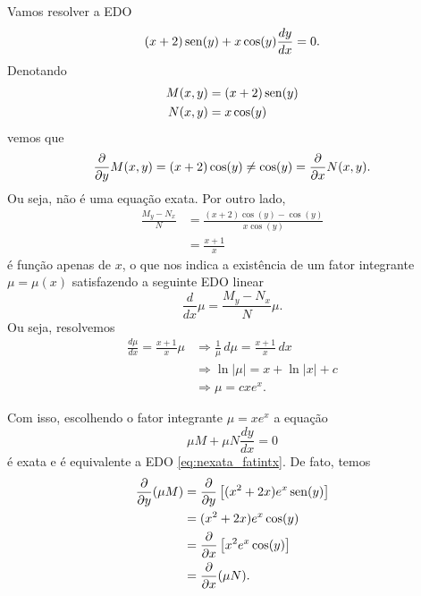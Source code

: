 \begin{ex}
  Vamos resolver a EDO
  \begin{equation}\label{eq:nexata_fatintx}
    (x+2)\operatorname{sen}(y) + x\cos(y)\frac{dy}{dx} = 0.
  \end{equation}
  Denotando
  \begin{align}
    M(x,y) &= (x+2)\operatorname{sen}(y) \\
    N(x,y) &= x\cos(y)
  \end{align}
  vemos que
  \begin{equation}
    \frac{\partial}{\partial y}M(x,y) = (x+2)\cos(y) \neq \cos(y) = \frac{\partial}{\partial x}N(x,y).
  \end{equation}
  Ou seja, não é uma equação exata. Por outro lado,
  \begin{align}
    \frac{M_y-N_x}{N} &= \frac{(x+2)\cos(y) - \cos(y)}{x\cos(y)} \\
                      &= \frac{x+1}{x}
  \end{align}
  é função apenas de $x$, o que nos indica a existência de um fator integrante $\mu = \mu(x)$ satisfazendo a seguinte EDO linear
  \begin{equation}
    \frac{d}{dx}\mu = \frac{M_y-N_x}{N}\mu. 
  \end{equation}
  Ou seja, resolvemos
  \begin{align}
    \frac{d\mu}{dx} = \frac{x+1}{x}\mu &\Rightarrow \frac{1}{\mu}\,d\mu = \frac{x+1}{x}\,dx \\
                                       &\Rightarrow \ln|\mu| = x + \ln|x| + c \\
                                       &\Rightarrow \mu = cxe^x.
  \end{align}

  Com isso, escolhendo o fator integrante $\mu = xe^x$ a equação
  \begin{equation}\label{eq:nexata_fatintx_aux}
    \mu M + \mu N\frac{dy}{dx} = 0
  \end{equation}
  é exata e é equivalente a EDO \eqref{eq:nexata_fatintx}. De fato, temos
  \begin{align}
    \frac{\partial}{\partial y}(\mu M) &= \frac{\partial}{\partial y}\left[(x^2+2x)e^x\operatorname{sen}(y)\right] \\
                           &= (x^2+2x)e^x\cos(y) \\
                           &= \frac{\partial}{\partial x} \left[x^2e^x\cos(y)\right] \\
                           &= \frac{\partial}{\partial x}(\mu N).
  \end{align}


\end{ex}
